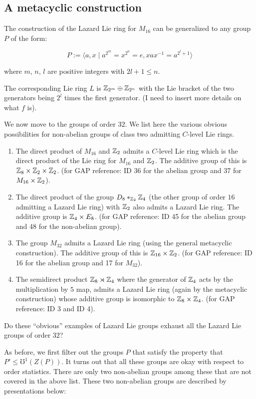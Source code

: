\documentclass[10pt]{amsart}
\begin{document}
\subsection{A metacyclic construction}

The construction of the Lazard Lie ring for $M_{16}$ can be
generalized to any group $P$ of the form:

$$P := \langle a,x \mid a^{2^m} = x^{2^n} = e, xax^{-1} = a^{2^l + 1} \rangle$$

where $m$, $n$, $l$ are positive integers with $2l + 1 \le n$.

The corresponding Lie ring $L$ is $\mathbb{Z}_{2^m} \oplus \mathbb{Z}_{2^n}$ with the
Lie bracket of the two generators being $2^l$ times the first
generator. (I need to insert more details on what $f$ is).

We now move to the groups of order $32$. We list here the various
obvious possibilities for non-abelian groups of class two admitting
$C$-level Lie rings.

\begin{enumerate}
\item The direct product of $M_{16}$ and $\mathbb{Z}_2$ admits a $C$-level Lie
  ring which is the direct product of the Lie ring for $M_{16}$ and
  $\mathbb{Z}_2$. The additive group of this is $\mathbb{Z}_8 \times \mathbb{Z}_2 \times
  \mathbb{Z}_2$. (for GAP reference: ID 36 for the abelian group and 37 for
  $M_{16} \times \mathbb{Z}_2$).
\item The direct product of the group $D_8 *_{\mathbb{Z}_2} \mathbb{Z}_4$ (the other
  group of order $16$ admitting a Lazard Lie ring) with $\mathbb{Z}_2$ also
  admits a Lazard Lie ring. The additive group is $\mathbb{Z}_4 \times
  E_8$. (for GAP reference: ID 45 for the abelian group and 48 for the
  non-abelian group).
\item The group $M_{32}$ admits a Lazard Lie ring (using the general
  metacyclic construction). The additive group of this is $\mathbb{Z}_{16}
  \times \mathbb{Z}_2$. (for GAP reference: ID 16 for the abelian group and 17
  for $M_{32}$).
\item The semidirect product $\mathbb{Z}_8 \rtimes \mathbb{Z}_4$ where the generator
  of $\mathbb{Z}_4$ acts by the multiplication by $5$ map, admits a Lazard Lie
  ring (again by the metacyclic construction) whose additive group is
  isomorphic to $\mathbb{Z}_8 \times \mathbb{Z}_4$. (for GAP reference: ID 3 and ID 4).
\end{enumerate}

Do these ``obvious'' examples of Lazard Lie groups exhaust all the
Lazard Lie groups of order $32$? 

As before, we first filter out the groups $P$ that satisfy the
property that $P' \le \mho^1(Z(P))$. It turns out that all these
groups are okay with respect to order statistics. There are only two
non-abelian groups among these that are not covered in the above
list. These two non-abelian groups are described by presentations
below:
\end{document}

